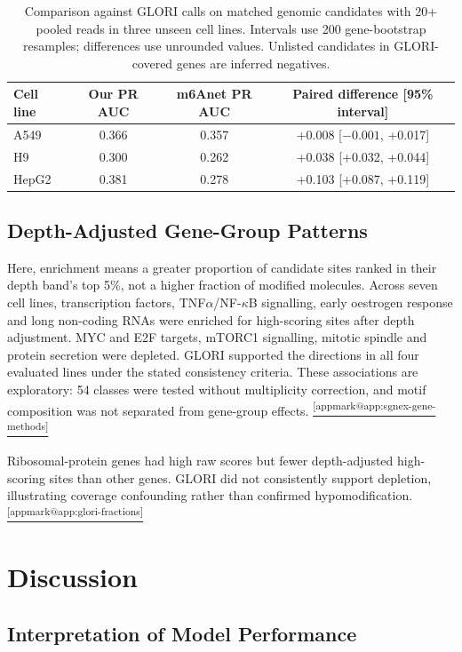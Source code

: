 \documentclass[11pt,a4paper]{article}
\makeatletter
\DeclareRobustCommand{\applink}[1]{%
    \hyperref[#1]{\textsuperscript{\ref*{appmark@#1}}}}
\makeatother
\begin{document}
\begin{table}[H]
\centering\small
\begin{tabular}{lccc}
\toprule
\textbf{Cell line} & \textbf{Our PR AUC} & \textbf{m6Anet PR AUC} & \textbf{Paired difference [95\% interval]} \\
\midrule
A549 & 0.366 & 0.357 & +0.008 [$-0.001$, +0.017] \\
H9 & 0.300 & 0.262 & +0.038 [+0.032, +0.044] \\
HepG2 & 0.381 & 0.278 & +0.103 [+0.087, +0.119] \\
\bottomrule
\end{tabular}
\caption{Comparison against GLORI calls on matched genomic candidates with
20+ pooled reads in three unseen cell lines. Intervals use 200 gene-bootstrap
resamples; differences use unrounded values. Unlisted candidates in
GLORI-covered genes are inferred negatives.}
\label{tab:glori-main}
\end{table}

\subsection{Depth-Adjusted Gene-Group Patterns}
Here, enrichment means a greater proportion of candidate sites ranked in
their depth band's top 5\%, not a higher fraction of modified molecules.
Across seven cell lines, transcription factors, TNF$\alpha$/NF-$\kappa$B
signalling, early oestrogen response and long non-coding RNAs were enriched
for high-scoring sites after depth adjustment. MYC and E2F targets, mTORC1
signalling, mitotic spindle and protein secretion were depleted. GLORI
supported the directions in all four evaluated lines under the stated
consistency criteria. These associations are exploratory: 54 classes were
tested without multiplicity correction, and motif composition was not
separated from gene-group effects.\applink{app:sgnex-gene-methods}

Ribosomal-protein genes had high raw scores but fewer depth-adjusted
high-scoring sites than other genes. GLORI did not consistently support
depletion, illustrating coverage confounding rather than confirmed
hypomodification.
\applink{app:glori-fractions}

\section{Discussion}

\subsection{Interpretation of Model Performance}
\label{sec:disc-model}
\end{document}
